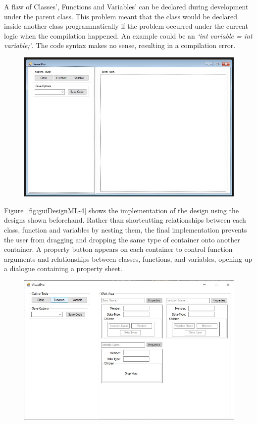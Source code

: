 \documentclass[12pt]{report} %
\begin{document}
				A flaw of Classes', Functions and Variables' can be declared during development under the parent class. This problem meant that the class would be declared inside another class programmatically if the problem occurred under the current logic when the compilation happened. An example could be an \textit{`int variable = int variable;'}. The code syntax makes no sense, resulting in a compilation error.
				\begin{figure}[H]
					{\includegraphics[scale=0.45]{Figures/vp-designs/NET_Framework-GUI-4.jpg}}
				\end{figure}

				Figure~\ref{fig:guiDesignML-4} shows the implementation of the design using the designs shown beforehand. Rather than shortcutting relationships between each class, function and variables by nesting them, the final implementation prevents the user from dragging and dropping the same type of container onto another container. A property button appears on each container to control function arguments and relationships between classes, functions, and variables, opening up a dialogue containing a property sheet.
				\begin{figure}[H]
					{\includegraphics[scale=0.45]{Figures/vp-designs/NET_Framework-GUI-Latest.jpg}}
				\end{figure}
			
\end{document}
